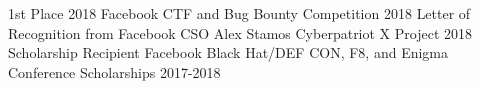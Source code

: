 




\begin{cvhonors}
  \cvhonor
  {1st Place} %
  {2018 Facebook CTF and Bug Bounty Competition} %
  {} %
  {2018} %
\cvhonor 
{Letter of Recognition from Facebook CSO Alex Stamos}
{Cyberpatriot X Project} %
{ } %
{2018} %
\cvhonor
  {Scholarship Recipient} %
  {Facebook Black Hat/DEF CON, F8, and Enigma Conference Scholarships} %
  {} %
  {2017-2018} %

\end{cvhonors}
